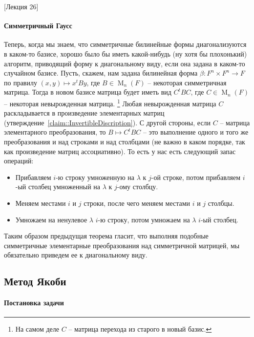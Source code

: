 [Лекция 26]


\paragraph{Симметричный Гаусс}

Теперь, когда мы знаем, что симметричные билинейные формы диагонализуются в каком-то базисе, хорошо было бы иметь какой-нибудь (ну хотя бы плохонький) алгоритм, приводящий форму к диагональному виду, если она задана в каком-то случайном базисе.
Пусть, скажем, нам задана билинейная форма $\beta\colon F^n \times F^n\to F$ по правилу $(x,y)\mapsto x^t By$, где $B\in \operatorname{M}_n(F)$ -- некоторая симметричная матрица.
Тогда в  новом базисе матрица будет иметь вид $C^t B C$, где $C\in \operatorname{M}_n(F)$ -- некоторая невырожденная матрица.%
\footnote{На самом деле $C$ -- матрица перехода из старого в новый базис.}
Любая невырожденная матрица $C$ раскладывается в произведение элементарных матриц (утверждение~\ref{claim::InvertibleDiscription}).
С другой стороны, если $C$ -- матрица элементарного преобразования, то $B \mapsto C^tBC$ -- это выполнение одного и того же преобразования и над строками и над столбцами (не важно в каком порядке, так как произведение матриц ассоциативно).
То есть у нас есть следующий запас операций:
\begin{itemize}
\item Прибавляем $i$-ю строку умноженную на $\lambda$ к $j$-ой строке, потом прибавляем $i$-ый столбец умноженный на $\lambda$ к $j$-ому столбцу.

\item Меняем местами $i$ и $j$ строки, после чего меняем местами $i$ и $j$ столбцы.

\item Умножаем на ненулевое $\lambda$ $i$-ю строку, потом умножаем на $\lambda$ $i$-ый столбец.
\end{itemize}
Таким образом предыдущая теорема гласит, что выполняя подобные симметричные элементарные преобразования над симметричной матрицей, мы обязательно приведем ее к диагональному виду.


\subsection{Метод Якоби}
\label{subsection::Jacoby}

\paragraph{Постановка задачи}

